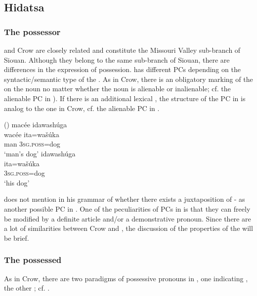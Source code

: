\documentclass[output=paper]{LSP/langsci}
\begin{document}
\subsection{Hidatsa}\label{sec:helmbrecht:4.2} \label{hidatsa} 
\subsubsection{The possessor}
 and Crow are closely related and constitute the Missouri Valley sub-branch of Siouan. Although they belong to the same sub-branch of Siouan, there are differences in the expression of possession.  has different PCs depending on the syntactic/semantic type of the . As in Crow, there is an obligatory marking of the  on the  noun no matter whether the  noun is alienable or inalienable; cf. the alienable PC in ). If there is an additional lexical , the structure of the PC in  is analog to the one in Crow, cf. the alienable PC in .

\ea {} (\citealt[81]{Boyle2007})
\ea \label{hidatsamansdog}
\glll macée idawashúga \\ 
wacée ita=wašúka \\
man  \textsc{3sg.poss}=dog \\
\glt `man's dog'
\ex \label{hidatsahisdog}
\glll idawashúga \\
ita=wašúka \\
\textsc{3sg.poss}=dog \\
\glt `his dog'
\z \z

\citet{Boyle2007} does not mention in his grammar of  whether there exists a juxtaposition of - as another possible PC in . One of the peculiarities of PCs in  is that they can freely be modified by a definite article and/or a demonstrative pronoun. Since there are a lot of similarities between Crow and , the discussion of the properties of the  will be brief.

\subsubsection{The possessed}

As in Crow, there are two paradigms of possessive pronouns in , one indicating , the other ; cf. .
\end{document}
